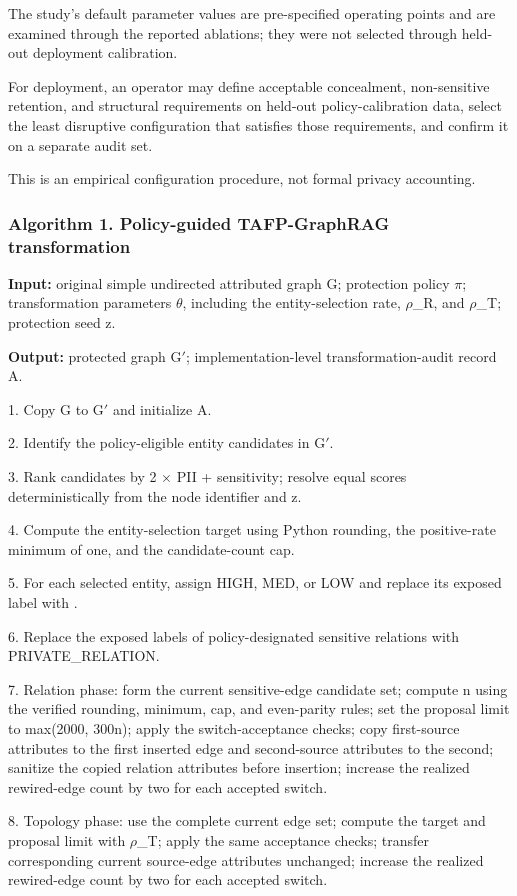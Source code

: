 \documentclass[preprint,12pt]{elsarticle}
\begin{document}
The study's default parameter values are pre-specified operating points and are examined through the reported ablations; they were not selected through held-out deployment calibration.

For deployment, an operator may define acceptable concealment, non-sensitive retention, and structural requirements on held-out policy-calibration data, select the least disruptive configuration that satisfies those requirements, and confirm it on a separate audit set.

This is an empirical configuration procedure, not formal privacy accounting.

\subsubsection*{Algorithm 1. Policy-guided TAFP-GraphRAG transformation}
\noindent\textbf{Input:} original simple undirected attributed graph G; protection policy $\pi$; transformation parameters $\theta$, including the entity-selection rate, $\rho$\_R, and $\rho$\_T; protection seed z.\par
\noindent\textbf{Output:} protected graph G$'$; implementation-level transformation-audit record A.\par
1. Copy G to G$'$ and initialize A.

2. Identify the policy-eligible entity candidates in G$'$.

3. Rank candidates by 2 $\times$ PII + sensitivity; resolve equal scores deterministically from the node identifier and z.

4. Compute the entity-selection target using Python rounding, the positive-rate minimum of one, and the candidate-count cap.

5. For each selected entity, assign HIGH, MED, or LOW and replace its exposed label with .

6. Replace the exposed labels of policy-designated sensitive relations with PRIVATE\_RELATION.

7. Relation phase: form the current sensitive-edge candidate set; compute n using the verified rounding, minimum, cap, and even-parity rules; set the proposal limit to max(2000, 300n); apply the switch-acceptance checks; copy first-source attributes to the first inserted edge and second-source attributes to the second; sanitize the copied relation attributes before insertion; increase the realized rewired-edge count by two for each accepted switch.

8. Topology phase: use the complete current edge set; compute the target and proposal limit with $\rho$\_T; apply the same acceptance checks; transfer corresponding current source-edge attributes unchanged; increase the realized rewired-edge count by two for each accepted switch.
\end{document}
